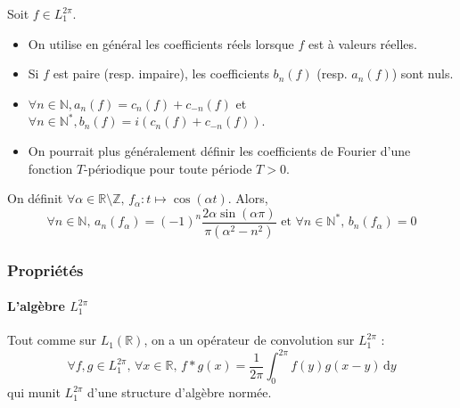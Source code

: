 	\begin{remark}
		Soit $f \in L_1^{2\pi}$.
		\begin{itemize}
			\item On utilise en général les coefficients réels lorsque $f$ est à valeurs réelles.
			\item Si $f$ est paire (resp. impaire), les coefficients $b_n(f)$ (resp. $a_n(f)$) sont nuls.
			\item $\forall n \in \mathbb{N}, a_n(f) = c_n(f) + c_{-n}(f)$ et $\forall n \in \mathbb{N}^*, b_n(f) = i(c_n(f) + c_{-n}(f))$.
			\item On pourrait plus généralement définir les coefficients de Fourier d'une fonction $T$-périodique pour toute période $T > 0$.
		\end{itemize}
	\end{remark}


	\begin{example}
		On définit $\forall \alpha \in \mathbb{R} \setminus \mathbb{Z}, \, f_\alpha : t \mapsto \cos(\alpha t)$. Alors,
		\[ \forall n \in \mathbb{N}, \, a_n(f_\alpha) = (-1)^n \frac{2 \alpha \sin(\alpha \pi)}{\pi (\alpha^2 - n^2)} \text{ et } \forall n \in \mathbb{N}^*, \, b_n(f_\alpha) = 0 \]
	\end{example}

	\subsubsection{Propriétés}

	\paragraph{L'algèbre \texorpdfstring{$L_1^{2 \pi}$}{L₁²ᵖⁱ}}


	\begin{proposition}
		Tout comme sur $L_1(\mathbb{R})$, on a un opérateur de convolution sur $L_1^{2 \pi}$ :
		\[ \forall f, g \in L_1^{2 \pi}, \, \forall x \in \mathbb{R}, \, f*g(x) = \frac{1}{2 \pi} \int_0^{2\pi} f(y) g(x - y) \, \mathrm{d}y \]
		qui munit $L_1^{2 \pi}$ d'une structure d'algèbre normée.
	\end{proposition}


